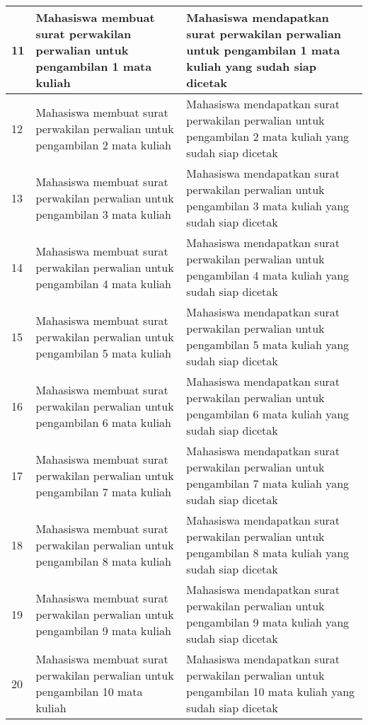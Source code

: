 \begin{itemize}
	\begin{table}[H]
	\centering
	\begin{tabular}{|l|p{6cm}|p{6cm}|}
	\hline
	11&Mahasiswa membuat surat perwakilan perwalian untuk pengambilan 1 mata kuliah&Mahasiswa mendapatkan surat perwakilan perwalian untuk pengambilan 1 mata kuliah yang sudah siap dicetak\\ \hline
	12&Mahasiswa membuat surat perwakilan perwalian untuk pengambilan 2 mata kuliah&Mahasiswa mendapatkan surat perwakilan perwalian untuk pengambilan 2 mata kuliah yang sudah siap dicetak\\ \hline
	13&Mahasiswa membuat surat perwakilan perwalian untuk pengambilan 3 mata kuliah&Mahasiswa mendapatkan surat perwakilan perwalian untuk pengambilan 3 mata kuliah yang sudah siap dicetak\\ \hline
	14&Mahasiswa membuat surat perwakilan perwalian untuk pengambilan 4 mata kuliah&Mahasiswa mendapatkan surat perwakilan perwalian untuk pengambilan 4 mata kuliah yang sudah siap dicetak\\ \hline
	15&Mahasiswa membuat surat perwakilan perwalian untuk pengambilan 5 mata kuliah&Mahasiswa mendapatkan surat perwakilan perwalian untuk pengambilan 5 mata kuliah yang sudah siap dicetak\\ \hline
	16&Mahasiswa membuat surat perwakilan perwalian untuk pengambilan 6 mata kuliah&Mahasiswa mendapatkan surat perwakilan perwalian untuk pengambilan 6 mata kuliah yang sudah siap dicetak\\ \hline
	17&Mahasiswa membuat surat perwakilan perwalian untuk pengambilan 7 mata kuliah&Mahasiswa mendapatkan surat perwakilan perwalian untuk pengambilan 7 mata kuliah yang sudah siap dicetak\\ \hline
	18&Mahasiswa membuat surat perwakilan perwalian untuk pengambilan 8 mata kuliah&Mahasiswa mendapatkan surat perwakilan perwalian untuk pengambilan 8 mata kuliah yang sudah siap dicetak\\ \hline
	19&Mahasiswa membuat surat perwakilan perwalian untuk pengambilan 9 mata kuliah&Mahasiswa mendapatkan surat perwakilan perwalian untuk pengambilan 9 mata kuliah yang sudah siap dicetak\\ \hline
	20&Mahasiswa membuat surat perwakilan perwalian untuk pengambilan 10 mata kuliah&Mahasiswa mendapatkan surat perwakilan perwalian untuk pengambilan 10 mata kuliah yang sudah siap dicetak\\ \hline
	\end{tabular}
	\end{table}	
	

\end{itemize}
